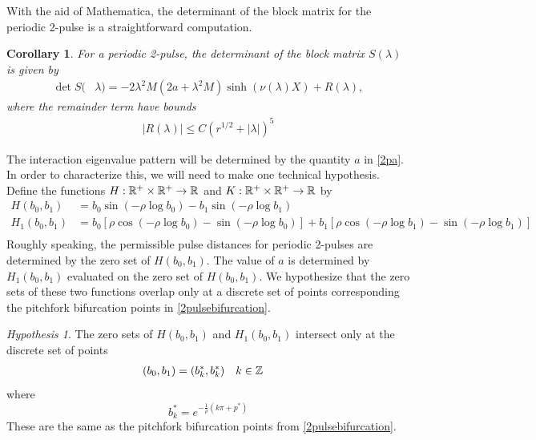 \documentclass[11pt,reqno]{amsart}
\theoremstyle{plain}
\newtheorem{corollary}[theorem]{Corollary}
\theoremstyle{definition}
\theoremstyle{remark}
\newtheorem{hypothesis}[theorem]{Hypothesis}
\begin{document}
With the aid of Mathematica, the determinant of the block matrix for the periodic 2-pulse is a straightforward computation.

\begin{corollary}\label{corr:2perDet1}
For a periodic 2-pulse, the determinant of the block matrix $S(\lambda)$ is given by
\begin{equation*}
\begin{aligned}
\det S(&\lambda) = -2 \lambda^2 M (2a + \lambda^2 M) \sinh(\nu(\lambda)X) + R(\lambda),
\end{aligned}
\end{equation*}
where the remainder term have bounds
\begin{align*}
|R(\lambda)| \leq C(r^{1/2} + |\lambda|)^5
\end{align*}
\end{corollary}

The interaction eigenvalue pattern will be determined by the quantity $a$ in \cref{2pa}. In order to characterize this, we will need to make one technical hypothesis. Define the functions $H: \mathbb{R}^+ \times \mathbb{R}^+ \rightarrow \mathbb{R}$ and $K: \mathbb{R}^+ \times \mathbb{R}^+ \rightarrow \mathbb{R}$ by 
\begin{align}
H(b_0, b_1) &= b_0 \sin \left( -\rho \log b_0 \right) - b_1 \sin \left( -\rho \log b_1 \right) \label{perdefH} \\
H_1(b_0, b_1) &= b_0 \left[ \rho \cos \left( -\rho \log b_0 \right) - \sin \left( -\rho \log b_0 \right) \right] + b_1 \left[ \rho \cos \left( -\rho \log b_1 \right) - \sin \left( -\rho \log b_1 \right) \right]  \label{perdefH1} \\
\end{align}
Roughly speaking, the permissible pulse distances for periodic 2-pulses are determined by the zero set of $H(b_0, b_1)$. 
The value of $a$ is determined by $H_1(b_0, b_1)$ evaluated on the zero set of $H(b_0, b_1)$. We hypothesize that the zero sets of these two functions overlap only at a discrete set of points corresponding the pitchfork bifurcation points in \cref{2pulsebifurcation}.

\begin{hypothesis}\label{Hoverlaphyp}
The zero sets of $H(b_0, b_1)$ and $H_1(b_0, b_1)$ intersect only at the discrete set of points
\begin{align*}
(b_0, b_1) &= (b_k^*, b_k^*) && k \in \mathbb{Z}
\end{align*}
where 
\begin{equation*}
b^*_k = e^{-\frac{1}{\rho} (k \pi + p^*) }
\end{equation*}
These are the same as the pitchfork bifurcation points from \cref{2pulsebifurcation}.
\end{hypothesis}
\end{document}
